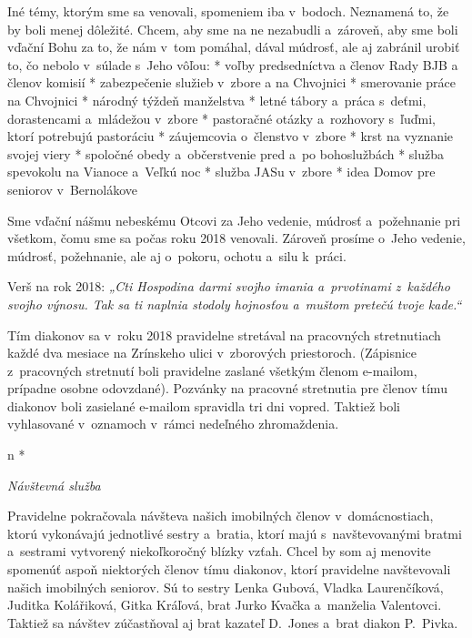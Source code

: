 Iné témy, ktorým sme sa venovali, spomeniem iba v~bodoch. Neznamená to, že by boli menej dôležité. Chcem, aby sme na ne nezabudli a~zároveň, aby sme boli vďační Bohu za to, že nám v~tom pomáhal, dával múdrosť, ale aj zabránil urobiť to, čo nebolo v~súlade s~Jeho vôľou:
\begitems
* voľby predsedníctva a členov Rady BJB a členov komisií
* zabezpečenie služieb v~zbore a na Chvojnici
* smerovanie práce na Chvojnici
* národný týždeň manželstva
* letné tábory a~práca s~deťmi, dorastencami a~mládežou v~zbore
* pastoračné otázky a~rozhovory s~ľuďmi, ktorí potrebujú pastoráciu
* záujemcovia o~členstvo v~zbore
* krst na vyznanie svojej viery
* spoločné obedy a~občerstvenie pred a~po bohoslužbách
* služba spevokolu na Vianoce a~Veľkú noc
* služba JASu v~zbore
* idea Domov pre seniorov v~Bernolákove
\enditems

Sme vďační nášmu nebeskému Otcovi za Jeho vedenie, múdrosť a~požehnanie pri všetkom, čomu sme sa počas roku 2018 venovali. Zároveň prosíme o~Jeho vedenie, múdrosť, požehnanie, ale aj o~pokoru, ochotu a~silu k~práci.



Verš na rok 2018: {\it „Cti Hospodina darmi svojho imania a~prvotinami z~každého svojho výnosu. Tak sa ti naplnia stodoly hojnosťou a~muštom pretečú tvoje kade.“}



Tím diakonov sa v~roku 2018 pravidelne stretával na pracovných stretnutiach každé dva mesiace na Zrínskeho ulici v~zborových priestoroch. (Zápisnice z~pracovných stretnutí boli pravidelne zaslané všetkým členom e-mailom, prípadne osobne odovzdané). Pozvánky na pracovné stretnutia pre členov tímu diakonov boli zasielané e-mailom spravidla tri dni vopred. Taktiež boli vyhlasované v~oznamoch v~rámci nedeľného zhromaždenia.

\def\aktivita#1{{\it #1\par}\firstnoindent}

\begitems \style n
* \aktivita{Návštevná služba}
Pravidelne pokračovala návšteva našich imobilných členov v~domácnostiach, ktorú vykonávajú jednotlivé sestry a~bratia, ktorí majú s~navštevovanými bratmi a~sestrami vytvorený niekoľkoročný blízky vzťah. Chcel by som aj menovite spomenúť aspoň niektorých členov tímu diakonov, ktorí pravidelne navštevovali našich imobilných seniorov. Sú to sestry Lenka Gubová, Vladka Laurenčíková, Juditka Kolářiková, Gitka Kráľová, brat Jurko Kvačka a~manželia Valentovci. Taktiež sa návštev zúčastňoval aj brat kazateľ D.~Jones a~brat diakon P.~Pivka.

